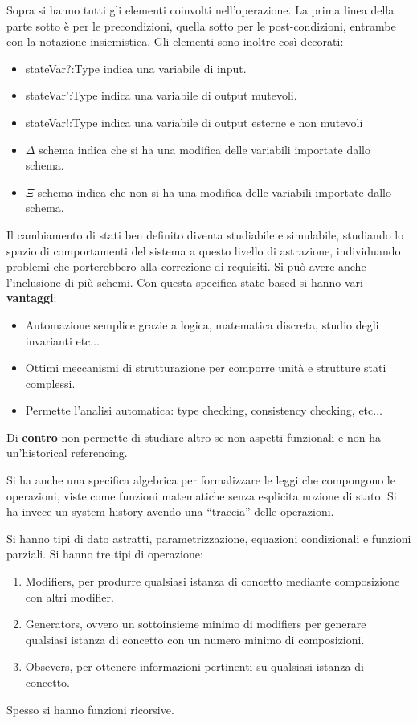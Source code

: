 Sopra si hanno tutti gli elementi coinvolti nell'operazione. La prima linea della
parte sotto è per le precondizioni, quella sotto per le post-condizioni, entrambe
con la notazione insiemistica. Gli elementi sono inoltre così decorati:
\begin{itemize}
      \item stateVar?:Type indica una variabile di input.
      \item stateVar':Type indica una variabile di output mutevoli.
      \item stateVar!:Type indica una variabile di output esterne e non mutevoli
      \item $\Delta$ schema indica che si ha una modifica delle variabili importate
            dallo schema.
      \item $\Xi$ schema indica che non si ha una modifica delle variabili importate
            dallo schema.
\end{itemize}
Il cambiamento di stati ben definito diventa studiabile e simulabile, studiando
lo spazio di comportamenti del sistema a questo livello di astrazione,
individuando problemi che porterebbero alla correzione di requisiti. Si può avere
anche l'inclusione di più schemi.
Con questa specifica state-based si hanno vari \textbf{vantaggi}:
\begin{itemize}
      \item Automazione semplice grazie a logica, matematica discreta, studio
            degli invarianti etc$\dots$
      \item Ottimi meccanismi di strutturazione per comporre unità e strutture
            stati complessi.
      \item Permette l'analisi automatica: type checking, consistency checking,
            etc$\dots$
\end{itemize}
Di \textbf{contro} non permette di studiare altro se non aspetti funzionali e non ha
un'historical referencing.

Si ha anche una specifica algebrica per formalizzare le leggi che compongono le
operazioni, viste come funzioni matematiche senza esplicita nozione di stato.
Si ha invece un system history avendo una “traccia” delle operazioni.

Si hanno tipi di dato astratti, parametrizzazione, equazioni condizionali e funzioni
parziali. Si hanno tre tipi di operazione:
\begin{enumerate}
      \item Modifiers, per produrre qualsiasi istanza di concetto mediante
            composizione con altri modifier.
      \item Generators, ovvero un sottoinsieme minimo di modifiers per generare
            qualsiasi istanza di concetto con un numero minimo di composizioni.
      \item Obsevers, per ottenere informazioni pertinenti su qualsiasi istanza
            di concetto.
\end{enumerate}
Spesso si hanno funzioni ricorsive.

